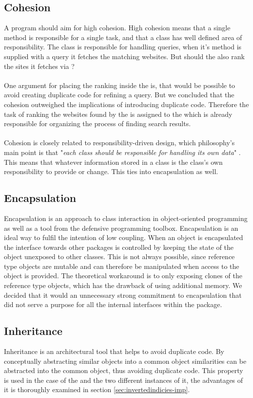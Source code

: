 \subsection{Cohesion}
A program should aim for high cohesion. %
High cohesion means that a single method is responsible for a single task, and that a class has well defined area of responsibility. 
The class  is responsible for handling queries, when it's method  is supplied with a query it fetches the matching websites. But should the  also rank the sites it fetches via ? 
\\ \\
One argument for placing the ranking inside the  is, that would be possible to avoid creating duplicate code for refining a query. But we concluded that the cohesion outweighed the implications of introducing duplicate code. Therefore the task of ranking the websites found by the  is assigned to the   which is already responsible for organizing the process of finding search results.
\\ \\
Cohesion is closely related to responsibility-driven design, which philosophy's main point is that "\textit{each class should be responsible for handling its own data}" \cite[270]{BK}. This means that whatever information stored in a class is the class's own responsibility to provide or change. This ties into encapsulation as well.

\subsection{Encapsulation}
Encapsulation is an approach to class interaction in object-oriented programming as well as a tool from the defensive programming toolbox. Encapsulation is an ideal way to fulfil the intention of low coupling. When an object is encapsulated the interface towards other packages is controlled by keeping the state of the object unexposed to other classes. This is not always possible, since reference type objects are mutable and can therefore be manipulated when access to the object is provided. The theoretical workaround is to only exposing clones of the reference type objects, which has the drawback of using additional memory. We decided that it would an unnecessary strong commitment to encapsulation that did not serve a purpose for all the internal interfaces within the  package.

\subsection{Inheritance} 
Inheritance is an architectural tool that helps to avoid duplicate code. By conceptually abstracting similar objects into a common object similarities can be abstracted into the common object, thus avoiding duplicate code. This property is used in the case of the  and the two different instances of it, the advantages of it is thoroughly examined in section \ref{sec:invertedindicies-imp}.
